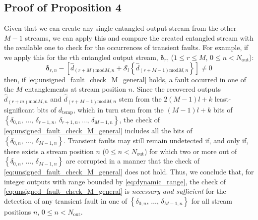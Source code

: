 \documentclass[twocolumn,english,onecolumn]{IEEEtran}
\theoremstyle{plain}
\theoremstyle{plain}
\begin{document}
\subsection{Proof of Proposition 4}
\begin{IEEEproof}
Given that we can create any single entangled output stream from the
other $M-1$ streams, we can apply this and compare the created entangled
stream with the available one to check for the occurrences of transient
faults. For example, if we apply this for the $r$th entangled output
stream, $\boldsymbol{\delta}_{r}$, ($1\leq r\leq M$, $0\leq n<N_{\text{out}}$):
\\
\begin{equation}
\mathrm{\mathbf{\delta}}_{r,n}-\left[\hat{d}_{\left(r+M\right)\text{mod}M,n}+\mathcal{S}_{l}\left\{ \hat{d}_{\left(r+M-1\right)\text{mod}M,n}\right\} \right]\neq0\label{eq:unsigned_fault_check_M_general}
\end{equation}
then, if \eqref{eq:unsigned_fault_check_M_general} holds, a fault
occurred in one of the $M$ entanglements at stream position $n$.
Since the recovered outputs $\hat{d}_{\left(r+m\right)\text{mod}M,n}$
and $\hat{d}_{\left(r+M-1\right)\text{mod}M,n}$ stem from the $2\left(M-1\right)l+k$
least-significant bits of $d_{\text{temp}}$, which in turn stem from
the $\left(M-1\right)l+k$ bits of $\left\{ \delta_{0,n},\,\ldots,\,\delta_{r-1,n},\,\delta_{r+1,n},\ldots,\,\delta_{M-1,n}\right\} $,
the check of \eqref{eq:unsigned_fault_check_M_general} includes all
the bits of $\left\{ \delta_{0,n},\,\ldots,\,\delta_{M-1,n}\right\} $.
Transient faults may still remain undetected if, and only if, there
exists a stream position $n$ ($0\leq n<N_{\text{out}}$) for which
two or more out of $\left\{ \delta_{0,n},\,\ldots,\,\delta_{M-1,n}\right\} $
are corrupted in a manner that the check of \eqref{eq:unsigned_fault_check_M_general}
does not hold. Thus, we conclude that, for integer outputs with range
bounded by \eqref{eq:dynamic_range}, the check of \eqref{eq:unsigned_fault_check_M_general}
is \emph{necessary and sufficient} for the detection of any transient
fault in one of $\left\{ \delta_{0,n},\,\ldots,\,\delta_{M-1,n}\right\} $
for all stream positions $n$, $0\leq n<N_{\text{out}}$.
\end{IEEEproof}


\end{document}
